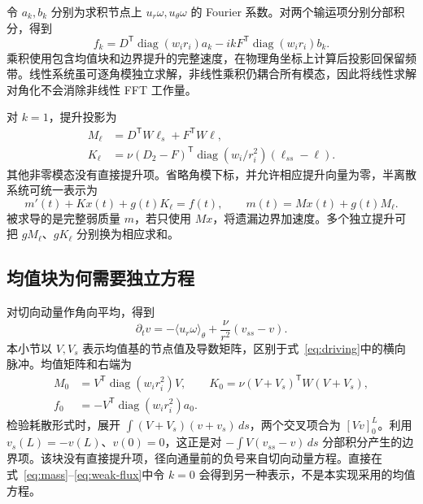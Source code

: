 令 \(a_k,b_k\) 分别为求积节点上 \(u_r\omega,u_\theta\omega\) 的 Fourier 系数。对两个输运项分别分部积分，得到
\begin{equation}
 f_k=D^{\mathsf T}\operatorname{diag}(w_i r_i)a_k
      -ikF^{\mathsf T}\operatorname{diag}(w_i r_i)b_k.
 \label{eq:weak-flux}
\end{equation}
乘积使用包含均值块和边界提升的完整速度，在物理角坐标上计算后投影回保留频带。线性系统虽可逐角模独立求解，非线性乘积仍耦合所有模态，因此将线性求解对角化不会消除非线性 FFT 工作量。

对 \(k=1\)，提升投影为
\begin{equation}
 \begin{aligned}
 M_\ell&=D^{\mathsf T}W\ell_s+F^{\mathsf T}W\ell,\\
 K_\ell&=\nu(D_2-F)^{\mathsf T}
       \operatorname{diag}(w_i/r_i^2)(\ell_{ss}-\ell).
 \end{aligned}
 \label{eq:lift-projections}
\end{equation}
其他非零模态没有直接提升项。省略角模下标，并允许相应提升向量为零，半离散系统可统一表示为
\begin{equation}
 m'(t)+Kx(t)+g(t)K_\ell=f(t),\qquad
 m(t)=Mx(t)+g(t)M_\ell.
 \label{eq:semidiscrete}
\end{equation}
被求导的是完整弱质量 \(m\)，若只使用 \(Mx\)，将遗漏边界加速度。多个独立提升可把 \(gM_\ell\)、\(gK_\ell\) 分别换为相应求和。

\subsection{均值块为何需要独立方程}

对切向动量作角向平均，得到
\begin{equation}
 \partial_t v=-\langle u_r\omega\rangle_\theta
       +\frac{\nu}{r^2}(v_{ss}-v).
 \label{eq:mean-equation}
\end{equation}
本小节以 \(V,V_s\) 表示均值基的节点值及导数矩阵，区别于式~\eqref{eq:driving}中的横向脉冲。均值矩阵和右端为
\begin{equation}
 \begin{aligned}
 M_0&=V^{\mathsf T}\operatorname{diag}(w_i r_i^2)V,\qquad
 K_0=\nu(V+V_s)^{\mathsf T}W(V+V_s),\\
 f_0&=-V^{\mathsf T}\operatorname{diag}(w_i r_i^2)a_0.
 \end{aligned}
 \label{eq:mean-matrices}
\end{equation}
检验耗散形式时，展开 \(\int(V+V_s)(v+v_s)\,ds\)，两个交叉项合为 \([Vv]_0^L\)。利用 \(v_s(L)=-v(L)\)、\(v(0)=0\)，这正是对 \(-\int V(v_{ss}-v)\,ds\) 分部积分产生的边界项。该块没有直接提升项，径向通量前的负号来自切向动量方程。直接在式~\eqref{eq:mass}--\eqref{eq:weak-flux}中令 \(k=0\) 会得到另一种表示，不是本实现采用的均值方程。

